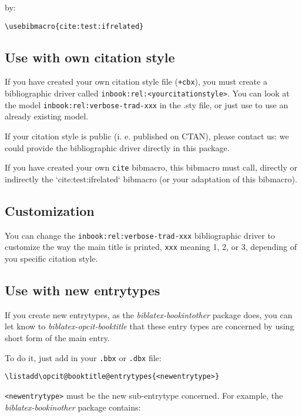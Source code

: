 \documentclass{ltxdockit}[2011/03/25]
\begin{document}
by:

\begin{verbatim}
\usebibmacro{cite:test:ifrelated}
\end{verbatim}

\subsection{Use with own citation style}

If you have created your own citation style file (\verb.+cbx.), you must create a bibliographic driver called \verb+inbook:rel:<yourcitationstyle>+. You can look at the model \verb+inbook:rel:verbose-trad-xxx+  in the .sty file, or just use  to use an already existing model.

If your citation style is public (i. e. published on CTAN), please contact us: we could provide the bibliographic driver directly in this package.

If you have created your own \verb+cite+ bibmacro, this bibmacro must call, directly or indirectly the `cite:test:ifrelated` bibmacro (or your adaptation of this bibmacro).


\subsection{Customization}

You can change the \verb+inbook:rel:verbose-trad-xxx+ bibliographic driver to customize the way the main title is printed, \verb+xxx+ meaning 1, 2, or 3, depending of you specific citation style.

\subsection{Use with new entrytypes}

If you create new entrytypes, as the \emph{biblatex-bookintother} package does, you can let know to \emph{biblatex-opcit-booktitle} that these entry types are concerned by using short form of the main entry.
 

To do it, just add in your \verb+.bbx+ or \verb+.dbx+ file:
\begin{verbatim}
\listadd\opcit@booktitle@entrytypes{<newentrytype>}
\end{verbatim}

\verb+<newentrytype>+ must be the new sub-entrytype concerned. For example, the \emph{biblatex-bookinother} package contains:
\end{document}
